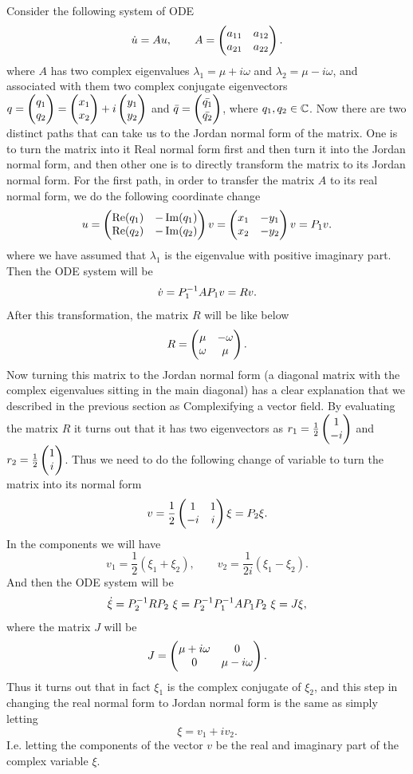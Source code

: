 Consider the following system of ODE
\[ \dot{u} = Au, \qquad A = \begin{pmatrix} a_{11} & a_{12} \\ a_{21} & a_{22} \end{pmatrix}. \]
where $A$ has two complex eigenvalues $\lambda_1 = \mu + i\omega$ and $\lambda_2 = \mu - i\omega$, and associated with them two complex conjugate eigenvectors $q = \begin{pmatrix} q_1 \\ q_2 \end{pmatrix} = \begin{pmatrix} x_1 \\ x_2 \end{pmatrix} + i\begin{pmatrix} y_1 \\ y_2 \end{pmatrix}$ and $\bar{q} = \begin{pmatrix} \bar{q_1} \\ \bar{q_2} \end{pmatrix}$, where $q_1, q_2 \in \mathbb{C}$. Now there are two distinct paths that can take us to the Jordan normal form of the matrix. One is to turn the matrix into it Real normal form first and then turn it into the Jordan normal form, and then other one is to directly transform the matrix to its Jordan normal form. For the first path, in order to transfer the matrix $A$ to its real normal form, we do the following coordinate change
\[  u = \begin{pmatrix} \operatorname{Re}(q_1) & -\operatorname{Im}(q_1) \\ \operatorname{Re}(q_2) & -\operatorname{Im}(q_2) \end{pmatrix} v = \begin{pmatrix} x_1 & -y_1 \\ x_2 & -y_2 \end{pmatrix} v = P_1 v.  \]
where we have assumed that $\lambda_1$ is the eigenvalue with positive imaginary part. Then the ODE system will be
\[ \dot{v} = P_1^{-1}AP_1 v = R v. \]
After this transformation, the matrix $R$ will be like below
\[ R = \begin{pmatrix} \mu & -\omega \\ \omega & \mu \end{pmatrix}. \]
Now turning this matrix to the Jordan normal form (a diagonal matrix with the complex eigenvalues sitting in the main diagonal) has a clear explanation that we described in the previous section as Complexifying a vector field. By evaluating the matrix $R$ it turns out that it has two eigenvectors as $r_1 = \frac{1}{2}\begin{pmatrix} 1 \\ -i \end{pmatrix}$ and $r_2 = \frac{1}{2}\begin{pmatrix} 1 \\ i \end{pmatrix}$. Thus we need to do the following change of variable to turn the matrix into its normal form
\[ v = \frac{1}{2}\begin{pmatrix} 1 & 1 \\ -i & i \end{pmatrix} \xi = P_2 \xi. \]
In the components we will have
\[ 
v_1 = \frac{1}{2}(\xi_1 + \xi_2),\qquad v_2 = \frac{1}{2i}(\xi_1 - \xi_2).
\]
And then the ODE system will be
\[ \dot{\xi} = P_2^{-1}RP_2\ \xi = P_2^{-1}P_1^{-1}A P_1 P_2\ \xi =  J \xi,   \]
where the matrix $J$ will be
\[ J = \begin{pmatrix} \mu+i\omega & 0 \\ 0 & \mu-i\omega \end{pmatrix}. \]
Thus it turns out that in fact $\xi_1$ is the complex conjugate of $\xi_2$, and this step in changing the real normal form to Jordan normal form is the same as simply letting
\[ \xi = v_1 + i v_2. \]
I.e. letting the components of the vector $v$ be the real and imaginary part of the complex variable $\xi$.

